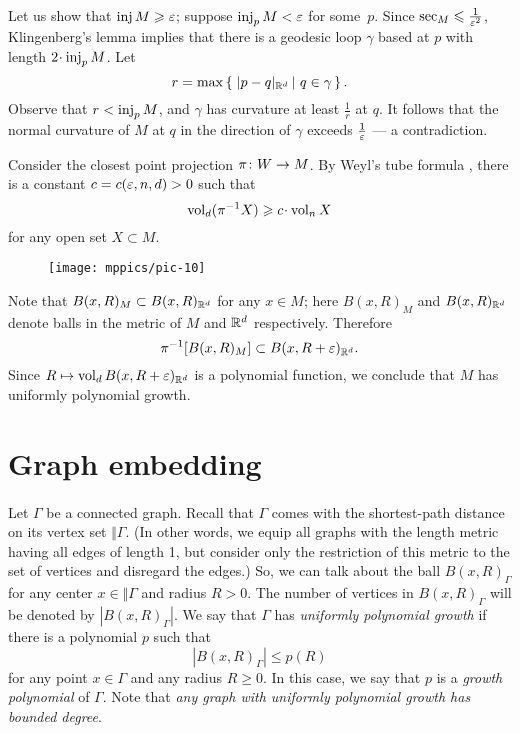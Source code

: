 \arxiv{\documentclass[a4paper,10pt]{article}}{\documentclass{mjm}}
\begin{document}
Let us show that $\operatorname{\rm inj} M\geqslant\varepsilon$; suppose $\operatorname{\rm inj}_pM<\varepsilon$ for some~$p$.
Since $\mathrm{sec}_M\leqslant\tfrac1{\varepsilon^2}$,
Klingenberg's lemma \cite[5.6]{cheeger-ebin} implies that there is a geodesic loop $\gamma$ based at $p$ with length $2\cdot \inj_pM$.
Let \[r=\max\set{|p-q|_{\RR^d}}{q\in\gamma}.\]
Observe that $r<\operatorname{\rm inj}_pM$, and $\gamma$ has curvature at least $\tfrac1r$ at $q$.
It follows that the normal curvature of $M$ at $q$ in the direction of $\gamma$ exceeds $\tfrac1{\varepsilon}$ --- a contradiction.

Consider the closest point projection $\pi\:W\z\to M$.
By Weyl's tube formula \cite{gray}, there is a constant $c\z=c(\eps,n,d)>0$ such that
\[\vol_d (\pi^{-1}X)\ge c\cdot\vol_n X\]
for any open set $X\subset M$.

{

\begin{wrapfigure}{o}{45 mm}
\vskip-14mm
\centering
\texttt{[image: mppics/pic-10]}
\vskip5mm
\end{wrapfigure}

Note that $B(x,R)_M\subset B(x,R)_{\mathbb{R}^d}$ for any $x\in M$;
here $B(x,R)_M$ and $B(x,R)_{\mathbb{R}^d}$ denote balls in the metric of $M$ and $\mathbb{R}^d$ respectively.
Therefore 
\[\pi^{-1}[B(x,R)_M]\subset B(x,R+\varepsilon)_{\mathbb{R}^d}.\]
Since $R\mapsto \operatorname{\rm vol}_d B(x,R+\varepsilon)_{\mathbb{R}^d}$ is a polynomial function, we conclude that $M$ has uniformly  polynomial growth.
\qeds

}

\section*{Graph embedding}

\paragraph{}\label{par:graph-embedding}
Let $\Gamma$ be a connected graph.
Recall that $\Gamma$ comes with the shortest-path distance on its vertex set $\Vert \Gamma$.
(In other words, we equip all graphs with the length metric having all edges of length 1, but consider only the restriction of this metric to the set of vertices and disregard the edges.)
So, we can talk about the ball $B(x,R)_\Gamma$ for any center $x\in \Vert \Gamma$ and radius $R>0$.
The number of vertices in $B(x,R)_\Gamma$ will be denoted by $|B(x,R)_\Gamma|$.
We say that $\Gamma$ has \emph{uniformly polynomial growth} if there is a polynomial $p$ such that 
\[|B(x,R)_\Gamma|\le p(R)\]
for any point $x\in \Gamma$ and any radius $R\ge 0$.
In this case, we say that $p$ is a \emph{growth polynomial} of $\Gamma$.
Note that \textit{any graph with uniformly polynomial growth has bounded degree}.
\end{document}
